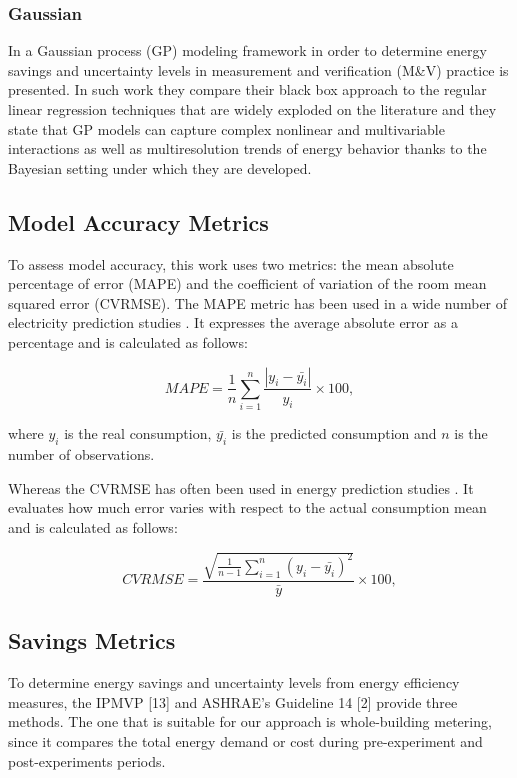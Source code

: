 \documentclass[10pt, conference, compsocconf]{IEEEtran}
\begin{document}
\subsubsection{Gaussian}

In \cite{heo2012gaussian} a Gaussian process (GP) modeling framework in order to determine energy savings and uncertainty levels in measurement and verification (M\&V) practice is presented.  In such work they compare their black box approach to the regular linear regression techniques that are widely exploded on the literature and they state that GP models can capture complex nonlinear and multivariable interactions as well as multiresolution trends of energy behavior thanks to the Bayesian setting under which they are developed. 

\subsection{Model Accuracy Metrics}

To assess model accuracy, this work uses two metrics: the mean absolute percentage of error (MAPE) and the coefficient of variation of the room mean squared error (CVRMSE).
The MAPE metric has been used in a wide number of electricity prediction studies \cite{fan2014development, edwards2012predicting}
. It expresses the average absolute error as a percentage and is calculated as follows:

\[
 MAPE = \frac{1}{n}\sum_{i=1}^{n} \frac{|y_i-\bar{y_i}|}{y_i}\times 100,
\]

where $y_i$ is the real consumption, $\bar{y_i}$ is the predicted consumption and $n$ is the number of observations.

Whereas the CVRMSE has often been used in energy prediction studies \cite{quilumba2015using} %
. It evaluates how much error varies with respect
to the actual consumption mean and is calculated as follows:

\[
 CVRMSE = \frac{\sqrt{\frac{1}{n-1}\sum_{i=1}^{n}(y_i-\bar{y_i})^2}}{\bar{y}} \times 100,
\]


\subsection{Savings Metrics}

To determine energy savings and uncertainty levels from energy efficiency measures, the IPMVP [13] and ASHRAE’s Guideline 14 [2] provide three methods. The one that is suitable for our approach is whole-building metering, since it compares the total energy demand or cost during pre-experiment and post-experiments periods.
\end{document}
